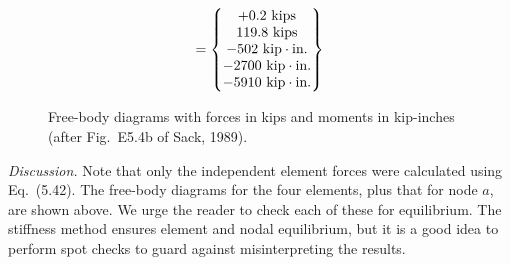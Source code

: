 \begin{enumerate}[leftmargin=*]
\begin{example}
\begin{solution}
\begin{equation*}
      = \begin{Bmatrix}+0.2\text{ kips}\\ 119.8\text{ kips}\\ -502\text{ kip}\cdot\text{in.}\\ -2700\text{ kip}\cdot\text{in.}\\ -5910\text{ kip}\cdot\text{in.}\end{Bmatrix}
    \end{equation*}
    \begin{figure}[H]
      \centering
      
      \caption{Free-body diagrams with forces in kips and moments in kip-inches (after Fig.~E5.4b of Sack, 1989).}
    \end{figure}
    \emph{Discussion.} Note that only the independent element forces were calculated using Eq.~(5.42). The free-body diagrams for the four elements, plus that for node $a$, are shown above. We urge the reader to check each of these for equilibrium. The stiffness method ensures element and nodal equilibrium, but it is a good idea to perform spot checks to guard against misinterpreting the results.
    \end{solution}
    \end{example}


\end{enumerate}
